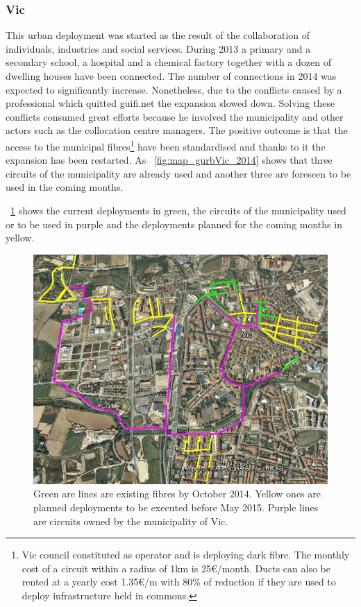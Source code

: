 \FloatBarrier
\subsubsection{Vic}
\label{dep_vic}

This urban deployment was started as the result of the collaboration of individuals, industries and social services. During 2013 a primary and a secondary school, a hospital and a chemical factory together with a dozen of dwelling houses have been connected. The number of connections in 2014 was expected to significantly increase. Nonetheless, due to the conflicts caused by a professional which quitted guifi.net the expansion slowed down. Solving these conflicts consumed great efforts because he involved the municipality and other actors such as the collocation centre managers. The positive outcome is that the access to the municipal fibres\footnote{Vic council constituted as operator and is deploying dark fibre. The monthly cost of a circuit within a radius of 1km is 25€/month. Ducts can also be rented at a yearly cost 1.35€/m with 80\% of reduction if they are used to deploy infrastructure held in commons.} have been standardised and thanks to it the expansion has been restarted. As \figurename~\ref{fig:map_gurbVic_2014} shows that three circuits of the municipality are already used and another three are foreseen to be used in the coming months.

\figurename~\ref{fig:map_vic_2014} shows the current deployments in green, the circuits of the municipality used or to be used in purple and the deployments planned for the coming months in yellow.

\begin{figure}[H]
  \centering
  \includegraphics[width=0.95\linewidth]{sect2/figures/map_vic_2014.jpg}
  \caption[Vic pilot - OF deployment]{Green are lines are existing fibres by October 2014. Yellow ones are planned deployments to be executed before May 2015. Purple lines are circuits owned by the municipality of Vic.}
  \label{fig:map_vic_2014}
\end{figure}



